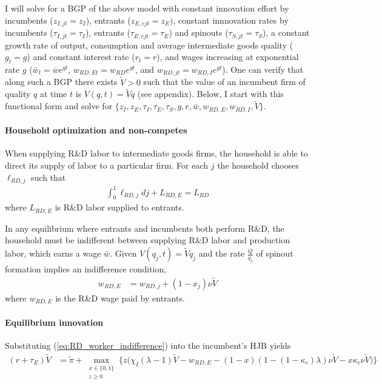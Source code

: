 \documentclass[12pt,english]{article}
\theoremstyle{remark}
\begin{document}
I will solve for a BGP of the above model with constant innovation effort by incumbents ($z_{I,jt} = z_I$), entrants ($z_{E,ejt} = z_{E})$, constant innnovation rates by incumbents ($\tau_{I,jt} = \tau_I$), entrants ($\tau_{E,ejt} = \tau_E$) and spinouts ($\tau_{S,jt} = \tau_S$), a constant growth rate of output, consumption and average intermediate goods quality ($g_t = g$) and constant interest rate ($r_t = r$), and wages increasing at exponential rate $g$ ($\bar{w}_t = \bar{w} e^{gt}$, $w_{RD,Et} = w_{RD}e^{gt}$, and $w_{RD,jt} = w_{RD,I}e^{gt}$). One can verify that along such a BGP there exists $\tilde{V} > 0$ such that the value of an incumbent firm of quality $q$ at time $t$ is $V(q,t) = \tilde{V}q$ (see appendix). Below, I start with this functional form and solve for $\{z_I,z_E,\tau_I,\tau_E,\tau_S,g,r,\bar{w},w_{RD,E},w_{RD,I},\tilde{V}\}$.

\paragraph{Household optimization and non-competes}

When supplying R\&D labor to intermediate goods firms, the household is able to direct its supply of labor to a particular firm. For each $j$ the household chooses $\ell_{RD,j}$ such that
\begin{align}
\int_0^1 \ell_{RD,j} dj + L_{RD,E} = L_{RD}
\end{align}
where $L_{RD,E}$ is R\&D labor supplied to entrants. 

In any equilibrium where entrants and incumbents both perform R\&D, the household must be indifferent between supplying R\&D labor and production labor, which earns a wage $\bar{w}$. Given $V(q_j,t) = \tilde{V}q_j$ and the rate $\frac{Q}{q_j}$ of spinout formation implies an indifference condition, 
\begin{align}
	w_{RD,E} &= w_{RD,j} + (1-x_j) \nu  \tilde{V} \label{eq:RD_worker_indifference}
\end{align}
where $w_{RD,E}$ is the R\&D wage paid by entrants.


\paragraph{Equilibrium innovation}

Substituting (\ref{eq:RD_worker_indifference}) into the incumbent's HJB yields
\begin{align}
	(r + \tau_E) \tilde{V} &= \tilde{\pi} + \max_{\substack{x \in \{0,1\} \\ z \ge 0}} \Big\{z \big(\chi_I (\lambda - 1) \tilde{V} - w_{RD,E} - (1-x) (1 - (1-\kappa_{e})\lambda)\nu \tilde{V} - x \kappa_{c} \nu \tilde{V}\big) \Big\} \label{eq:hjb_incumbent_workerIndiff}
\end{align}
\end{document}
